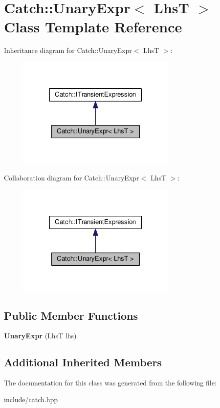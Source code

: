 \hypertarget{classCatch_1_1UnaryExpr}{}\section{Catch\+:\+:Unary\+Expr$<$ LhsT $>$ Class Template Reference}
\label{classCatch_1_1UnaryExpr}


Inheritance diagram for Catch\+:\+:Unary\+Expr$<$ LhsT $>$\+:
\nopagebreak
\begin{figure}[H]
\begin{center}
\leavevmode
\includegraphics[width=221pt]{classCatch_1_1UnaryExpr__inherit__graph}
\end{center}
\end{figure}


Collaboration diagram for Catch\+:\+:Unary\+Expr$<$ LhsT $>$\+:
\nopagebreak
\begin{figure}[H]
\begin{center}
\leavevmode
\includegraphics[width=221pt]{classCatch_1_1UnaryExpr__coll__graph}
\end{center}
\end{figure}
\subsection*{Public Member Functions}
\begin{DoxyCompactItemize}
\item 
{\bfseries Unary\+Expr} (LhsT lhs)\hypertarget{classCatch_1_1UnaryExpr_ae02f666a1e64da728628aa2033e1d6e7}{}\label{classCatch_1_1UnaryExpr_ae02f666a1e64da728628aa2033e1d6e7}

\end{DoxyCompactItemize}
\subsection*{Additional Inherited Members}


The documentation for this class was generated from the following file\+:\begin{DoxyCompactItemize}
\item 
include/catch.\+hpp\end{DoxyCompactItemize}
